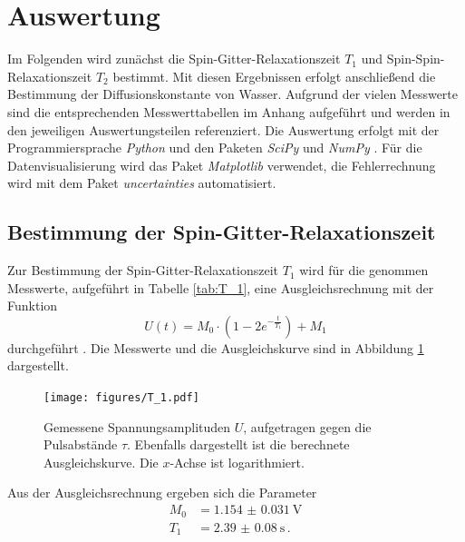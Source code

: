 \section{Auswertung}
Im Folgenden wird zunächst die Spin-Gitter-Relaxationszeit $T_1$
und Spin-Spin-Relaxationszeit $T_2$ bestimmt. Mit diesen Ergebnissen erfolgt anschließend die Bestimmung
der Diffusionskonstante von Wasser. Aufgrund der vielen Messwerte sind die entsprechenden 
Messwerttabellen im Anhang aufgeführt und werden in den jeweiligen Auswertungsteilen referenziert. 
Die Auswertung erfolgt mit der Programmiersprache \textit{Python} und den Paketen \textit{SciPy} \cite{SciPy} und
\textit{NumPy} \cite{NumPy}. Für die Datenvisualisierung wird das Paket \textit{Matplotlib} \cite{Matplotlib} 
verwendet, die Fehlerrechnung wird mit dem Paket \textit{uncertainties} \cite{uncertainties} automatisiert.

\subsection*{Bestimmung der Spin-Gitter-Relaxationszeit}
Zur Bestimmung der Spin-Gitter-Relaxationszeit $T_1$ wird für die genommen Messwerte, aufgeführt in Tabelle 
\ref{tab:T_1}, eine Ausgleichsrechnung mit der Funktion 
\begin{equation*}
    U(t) = M_0 \cdot \left(1 - 2 e^{-\frac{t}{T_1}}\right) + M_1
\end{equation*}
durchgeführt \cite{Finke}. Die Messwerte und die Ausgleichskurve sind in Abbildung \ref{fig:T_1} dargestellt.
\begin{figure}
    \centering
    \texttt{[image: figures/T\_1.pdf]}
    \caption{Gemessene Spannungsamplituden $U$, aufgetragen gegen die Pulsabstände $\tau$. Ebenfalls dargestellt
            ist die berechnete Ausgleichskurve. Die $x$-Achse ist logarithmiert.}
    \label{fig:T_1}
\end{figure}
Aus der Ausgleichsrechnung ergeben sich die Parameter
\begin{align*}
    M_0 &= \SI{1.154(31)}{\volt} \\
    T_1 &= \SI{2.39(8)}{\second} \, .
\end{align*}

